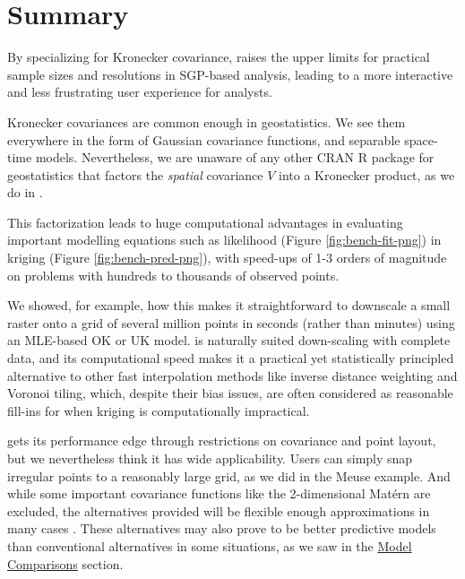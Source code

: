 \hypertarget{summary}{%
\section{Summary}\label{summary}}

By specializing for Kronecker covariance,  raises the upper limits for practical sample sizes and resolutions in SGP-based analysis, leading to a more interactive and less frustrating user experience for analysts.

Kronecker covariances are common enough in geostatistics. We see them everywhere in the form of Gaussian covariance functions, and separable space-time models. Nevertheless, we are unaware of any other CRAN R package for geostatistics that factors the \emph{spatial} covariance \(V\) into a Kronecker product, as we do in .

This factorization leads to huge computational advantages in evaluating important modelling equations such as likelihood (Figure \ref{fig:bench-fit-png}) in kriging (Figure \ref{fig:bench-pred-png}), with speed-ups of 1-3 orders of magnitude on problems with hundreds to thousands of observed points.

We showed, for example, how this makes it straightforward to downscale a small raster onto a grid of several million points in seconds (rather than minutes) using an MLE-based OK or UK model.  is naturally suited down-scaling with complete data, and its computational speed makes it a practical yet statistically principled alternative to other fast interpolation methods like inverse distance weighting and Voronoi tiling, which, despite their bias issues, are often considered as reasonable fill-ins for when kriging is computationally impractical.

 gets its performance edge through restrictions on covariance and point layout, but we nevertheless think it has wide applicability. Users can simply snap irregular points to a reasonably large grid, as we did in the Meuse example. And while some important covariance functions like the 2-dimensional Matérn are excluded, the alternatives provided will be flexible enough approximations in many cases \citep{koch2020computationally}. These alternatives may also prove to be better predictive models than conventional alternatives in some situations, as we saw in the \protect\hyperlink{model-comparisons}{Model Comparisons} section.



